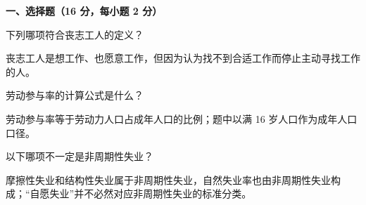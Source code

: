 ﻿
\newcommand{\finalsamplefigdir}{figures}
\newcommand{\acctcell}[1]{\begin{tabular}[t]{@{}l@{}}#1\end{tabular}}
\newcommand{\emptyacct}[1]{%
\begin{center}
\begin{tabular}{|p{0.45\linewidth}|p{0.45\linewidth}|}
\hline
\multicolumn{2}{|c|}{#1}\\
\hline
资产 & 负债\\
\hline
\vspace{1.1cm} & \vspace{1.1cm}\\
\hline
\end{tabular}
\end{center}}

\textbf{一、选择题（16 分，每小题 2 分）}

\begin{question}
下列哪项符合丧志工人的定义？
\begin{choiceoptions}[1]
\end{choiceoptions}
\begin{solution}
丧志工人是想工作、也愿意工作，但因为认为找不到合适工作而停止主动寻找工作的人。
\end{solution}
\end{question}

\begin{question}
劳动参与率的计算公式是什么？
\begin{choiceoptions}[1]
\end{choiceoptions}
\begin{solution}
劳动参与率等于劳动力人口占成年人口的比例；题中以满 16 岁人口作为成年人口口径。
\end{solution}
\end{question}

\begin{question}
以下哪项不一定是非周期性失业？
\begin{choiceoptions}[2]
\end{choiceoptions}
\begin{solution}
摩擦性失业和结构性失业属于非周期性失业，自然失业率也由非周期性失业构成；“自愿失业”并不必然对应非周期性失业的标准分类。
\end{solution}
\end{question}

